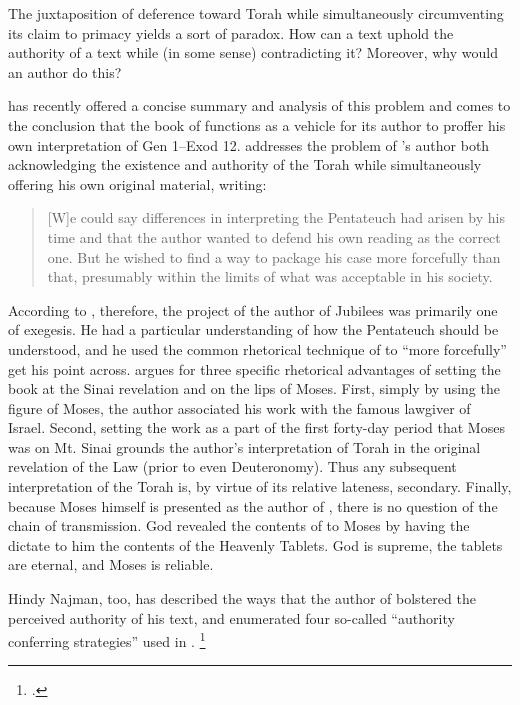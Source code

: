The juxtaposition of deference toward Torah while simultaneously circumventing its claim to primacy yields a sort of \psgraphical paradox. How can a text uphold the authority of a text while (in some sense) contradicting it? Moreover, why would an author do this? 

\vanderkam has recently offered a concise summary and analysis of this problem and comes to the conclusion that the book of \jub functions as a vehicle for its author to proffer his own interpretation of Gen 1--Exod 12. \vanderkam addresses the problem of \jub's author both acknowledging the existence and authority of the Torah while simultaneously offering his own original material, writing:

\begin{quote}
    [W]e could say differences in interpreting the Pentateuch had arisen by his time and that the author wanted to defend his own reading as the correct one. But he wished to find a way to package his case more forcefully than that, presumably within the limits of what was acceptable in his society.\autocite[28]{vanderkam_metso-etal2010}
\end{quote}

According to \vanderkam, therefore, the project of the author of Jubilees was primarily one of exegesis. He had a particular understanding of how the Pentateuch should be understood, and he used the common rhetorical technique of \psy to ``more forcefully'' get his point across.%
    \autocite[28]{vanderkam_metso-etal2010}
\vanderkam argues for three specific rhetorical advantages of setting the book at the Sinai revelation and on the lips of Moses. First, simply by using the figure of Moses, the author associated his work with the famous lawgiver of Israel. Second, setting the work as a part of the first forty-day period that Moses was on Mt. Sinai grounds the author's interpretation of Torah in the original revelation of the Law (prior to even Deuteronomy). Thus any subsequent interpretation of the Torah is, by virtue of its relative lateness, secondary. Finally, because Moses himself is presented as the author of \jub, there is no question of the chain of transmission. God revealed the contents of \jub to Moses by having the \ap dictate to him the contents of the Heavenly Tablets. God is supreme, the tablets are eternal, and Moses is reliable.

Hindy Najman, too, has described the ways that the author of \jub bolstered the perceived authority of his text, and enumerated four so-called ``authority conferring strategies'' used in \jub.%
    \footnote{\cite[380]{najman_jsj1999}.}

